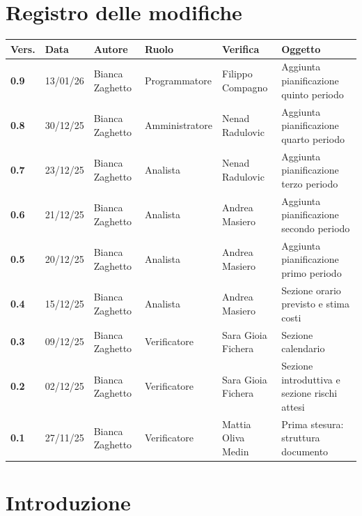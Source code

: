 \documentclass[a4paper,12pt]{article}
\begin{document}


\newpage
\section*{Registro delle modifiche}

\begin{table}[h!]
\begin{tabularx}{\textwidth}{|l|l|l|l|L|L|}
\hline
\textbf{Vers.} & \textbf{Data} & \textbf{Autore} & \textbf{Ruolo} & \textbf{Verifica} & \textbf{Oggetto} \\
\hline
\textbf{0.9} & 13/01/26 & Bianca Zaghetto & Programmatore & Filippo Compagno & Aggiunta pianificazione quinto periodo \\
\hline
\textbf{0.8} & 30/12/25 & Bianca Zaghetto & Amministratore & Nenad Radulovic & Aggiunta pianificazione quarto periodo \\
\hline
\textbf{0.7} & 23/12/25 & Bianca Zaghetto & Analista & Nenad Radulovic & Aggiunta pianificazione terzo periodo \\
\hline
\textbf{0.6} & 21/12/25 & Bianca Zaghetto & Analista & Andrea Masiero & Aggiunta pianificazione secondo periodo \\
\hline
\textbf{0.5} & 20/12/25 & Bianca Zaghetto & Analista & Andrea Masiero & Aggiunta pianificazione primo periodo \\
\hline
\textbf{0.4} & 15/12/25 & Bianca Zaghetto & Analista & Andrea Masiero & Sezione orario previsto e stima costi \\
\hline
\textbf{0.3} & 09/12/25 & Bianca Zaghetto & Verificatore & Sara Gioia Fichera & Sezione calendario \\
\hline
\textbf{0.2} & 02/12/25 & Bianca Zaghetto & Verificatore & Sara Gioia Fichera & Sezione introduttiva e sezione rischi attesi \\
\hline
\textbf{0.1} & 27/11/25 & Bianca Zaghetto & Verificatore & Mattia Oliva Medin & Prima stesura: struttura documento \\
\hline
\end{tabularx}
\end{table}

\newpage
\tableofcontents

\newpage
\listoffigures

\newpage
\listoftables

\newpage

\section{Introduzione}
\end{document}
